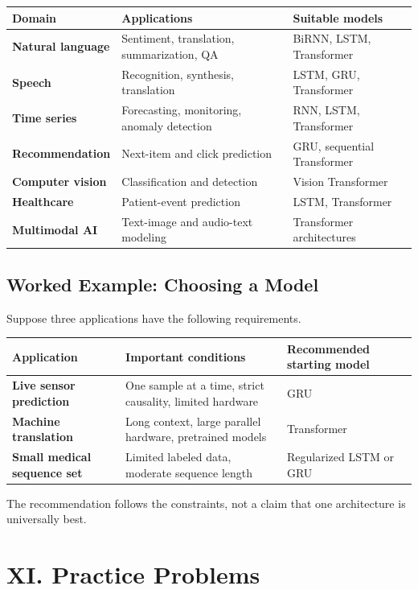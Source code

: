 \documentclass[11pt,a4paper,twoside]{article}
\begin{document}
\begin{center}
\begin{tabularx}{0.98\textwidth}{>{\bfseries}p{3.0cm}XX}
\toprule
Domain&Applications&Suitable models\\ \midrule
Natural language&Sentiment, translation, summarization, QA&BiRNN, LSTM, Transformer\\
Speech&Recognition, synthesis, translation&LSTM, GRU, Transformer\\
Time series&Forecasting, monitoring, anomaly detection&RNN, LSTM, Transformer\\
Recommendation&Next-item and click prediction&GRU, sequential Transformer\\
Computer vision&Classification and detection&Vision Transformer\\
Healthcare&Patient-event prediction&LSTM, Transformer\\
Multimodal AI&Text-image and audio-text modeling&Transformer architectures\\ \bottomrule
\end{tabularx}
\end{center}

\subsection*{Worked Example: Choosing a Model}

Suppose three applications have the following requirements.

\begin{center}
\begin{tabularx}{0.97\textwidth}{>{\bfseries}p{3.0cm}XX}
\toprule
Application&Important conditions&Recommended starting model\\ \midrule
Live sensor prediction&One sample at a time, strict causality, limited hardware&GRU\\
Machine translation&Long context, large parallel hardware, pretrained models&Transformer\\
Small medical sequence set&Limited labeled data, moderate sequence length&Regularized LSTM or GRU\\ \bottomrule
\end{tabularx}
\end{center}

The recommendation follows the constraints, not a claim that one architecture is universally best.

\section*{XI. Practice Problems}
\end{document}
